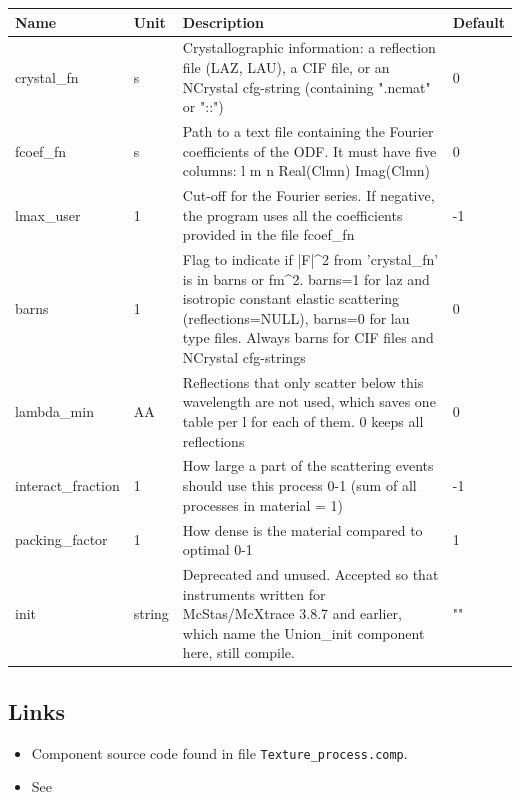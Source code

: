 \begin{longtable}{p{}p{}p{}p{}}
\toprule
\textbf{Name} & \textbf{Unit} & \textbf{Description} & \textbf{Default} \\
\midrule
\endhead
crystal\_fn & s & Crystallographic information: a reflection file (LAZ, LAU), a CIF file, or an NCrystal cfg-string (containing ".ncmat" or "::") & 0 \\
fcoef\_fn & s & Path to a text file containing the Fourier coefficients of the ODF. It must have five columns: l m n Real(Clmn) Imag(Clmn) & 0 \\
lmax\_user & 1 & Cut-off for the Fourier series. If negative, the program uses all the coefficients provided in the file fcoef\_fn & -1 \\
barns & 1 & Flag to indicate if |F|\textasciicircum{}2 from 'crystal\_fn' is in barns or fm\textasciicircum{}2. barns=1 for laz and isotropic constant elastic scattering (reflections=NULL), barns=0 for lau type files. Always barns for CIF files and NCrystal cfg-strings & 0 \\
lambda\_min & AA & Reflections that only scatter below this wavelength are not used, which saves one table per l for each of them. 0 keeps all reflections & 0 \\
interact\_fraction & 1 & How large a part of the scattering events should use this process 0-1 (sum of all processes in material = 1) & -1 \\
packing\_factor & 1 & How dense is the material compared to optimal 0-1 & 1 \\
init & string & Deprecated and unused. Accepted so that instruments written for McStas/McXtrace 3.8.7 and earlier, which name the Union\_init component here, still compile. & "" \\
\bottomrule
\end{longtable}

\subsection*{Links}
\begin{itemize}
  \item Component source code found in file \texttt{Texture\_process.comp}.
  \item See 
\end{itemize}
